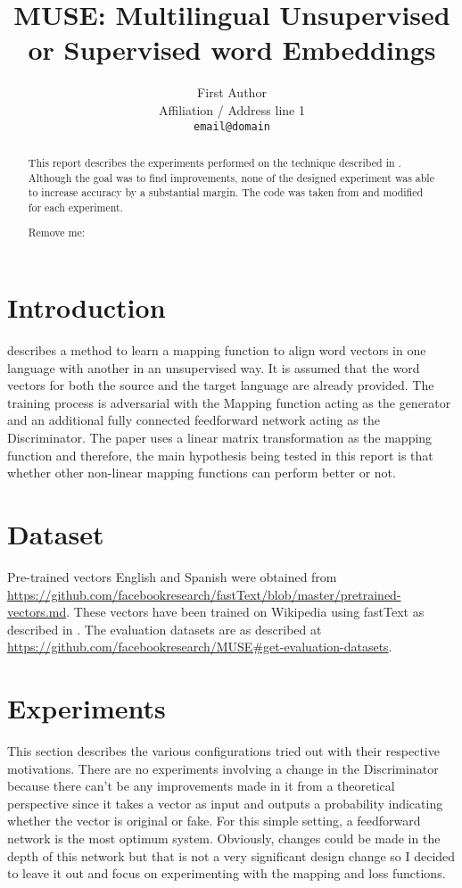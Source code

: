 \documentclass[11pt]{article}
\title{MUSE: Multilingual Unsupervised or Supervised word Embeddings}
\author{First Author \\
  Affiliation / Address line 1 \\
  {\tt email@domain}}
\date{}
\begin{document}
\maketitle
\begin{abstract}
This report describes the experiments performed on the technique described in \cite{conneau2017word}. Although the goal was to find improvements, none of the designed experiment was able to increase accuracy by a substantial margin. The code was taken from \cite{muserepo} and modified for each experiment.

Remove me: \cite{lample2017unsupervised}

\end{abstract}

\section{Introduction}
\cite{conneau2017word} describes a method to learn a mapping function to align word vectors in one language with another in an unsupervised way. It is assumed that the word vectors for both the source and the target language are already provided. The training process is adversarial with the Mapping function acting as the generator and an additional fully connected feedforward network acting as the Discriminator. The paper uses a linear matrix transformation as the mapping function and therefore, the main hypothesis being tested in this report is that whether other non-linear mapping functions can perform better or not.

\section{Dataset}
Pre-trained vectors English and Spanish were obtained from \url{https://github.com/facebookresearch/fastText/blob/master/pretrained-vectors.md}. These vectors have been trained on Wikipedia using fastText as described in \cite{bojanowski2016enriching}. The evaluation datasets are as described at \url{https://github.com/facebookresearch/MUSE#get-evaluation-datasets}.

\section{Experiments}
This section describes the various configurations tried out with their respective motivations. There are no experiments involving a change in the Discriminator because there can't be any improvements made in it from a theoretical perspective since it takes a vector as input and outputs a probability indicating whether the vector is original or fake. For this simple setting, a feedforward network is the most optimum system. Obviously, changes could be made in the depth of this network but that is not a very significant design change so I decided to leave it out and focus on experimenting with the mapping and loss functions.
\end{document}
